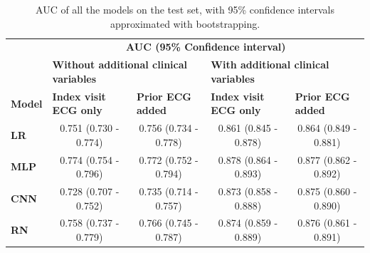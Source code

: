 \documentclass[preprint]{elsarticle}
\begin{document}
\renewcommand{\arraystretch}{1.2}
\begin{table}[H]
  \centering
  \scriptsize
\begin{adjustbox}{center}
\begin{tabular}{@{}lcccc@{}}
  \toprule
  & \multicolumn{4}{c}{\textbf{AUC (95\% Confidence interval)}} \\
  \cmidrule(lr){2-5}
  & \multicolumn{2}{l}{\textbf{Without additional clinical variables}} & \multicolumn{2}{l}{\textbf{With additional clinical variables}} \\
  \cmidrule(lr){2-3}\cmidrule(lr){4-5}
\textbf{Model} & \multicolumn{1}{l}{\textbf{Index visit ECG only}} & \multicolumn{1}{l}{\textbf{Prior ECG added}} & \multicolumn{1}{l}{\textbf{Index visit ECG only}} & \multicolumn{1}{l}{\textbf{Prior ECG added}} \\
  \midrule

\textbf{LR} & 0.751 (0.730 - 0.774) & 0.756 (0.734 - 0.778) & 0.861 (0.845 - 0.878) & 0.864 (0.849 - 0.881) \\
\textbf{MLP} & 0.774 (0.754 - 0.796) & 0.772 (0.752 - 0.794) & 0.878 (0.864 - 0.893) & 0.877 (0.862 - 0.892) \\
\textbf{CNN} & 0.728 (0.707 - 0.752) & 0.735 (0.714 - 0.757) & 0.873 (0.858 - 0.888) & 0.875 (0.860 - 0.890) \\
\textbf{RN} & 0.758 (0.737 - 0.779) & 0.766 (0.745 - 0.787) & 0.874 (0.859 - 0.889) & 0.876 (0.861 - 0.891) \\

\bottomrule
\end{tabular}
\end{adjustbox}
\caption{AUC of all the models on the test set, with 95\% confidence intervals approximated with bootstrapping.}
\label{table:appendix:mainresults}
\end{table}
\renewcommand{\arraystretch}{1}
\end{document}
